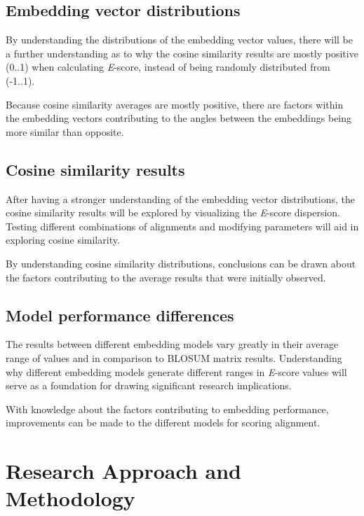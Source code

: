 \documentclass[
	letterpaper, %
	10pt, %
]{journalArticle}
\begin{document}
\subsection{Embedding vector distributions}

By understanding the distributions of the embedding vector values, there will be a further understanding as to why the cosine similarity results are mostly positive (0..1) when calculating \textit{E}-score, instead of being randomly distributed from (-1..1).

Because cosine similarity averages are mostly positive, there are factors within the embedding vectors contributing to the angles between the embeddings being more similar than opposite.

\subsection{Cosine similarity results}

After having a stronger understanding of the embedding vector distributions, the cosine similarity results will be explored by visualizing the \textit{E}-score dispersion. Testing different combinations of alignments and modifying parameters will aid in exploring cosine similarity.

By understanding cosine similarity distributions, conclusions can be drawn about the factors contributing to the average results that were initially observed.

\subsection{Model performance differences}

The results between different embedding models vary greatly in their average range of values and in comparison to BLOSUM \autocite{Henikoff:1992} matrix results. Understanding why different embedding models generate different ranges in \textit{E}-score values will serve as a foundation for drawing significant research implications. 

With knowledge about the factors contributing to embedding performance, improvements can be made to the different models for scoring alignment.

\section{Research Approach and Methodology}
\end{document}

